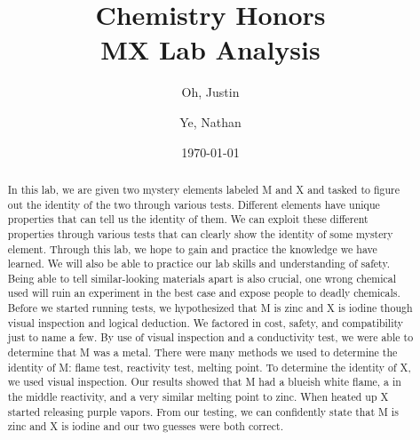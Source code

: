 \documentclass[titlepage]{article}
\title{\Huge{Chemistry Honors \\ MX Lab Analysis}}
\author{\huge{Oh, Justin} \and \huge{Ye, Nathan}}
\date{\LARGE{\today}}
\begin{document}
\maketitle


\begin{abstract}

In this lab, we are given two mystery elements labeled M and X and tasked to figure out the identity of the two through various tests. Different elements have unique properties that can tell us the identity of them. We can exploit these different properties through various tests that can clearly show the identity of some mystery element. Through this lab, we hope to gain and practice the knowledge we have learned. We will also be able to practice our lab skills and understanding of safety. Being able to tell similar-looking materials apart is also crucial, one wrong chemical used will ruin an experiment in the best case and expose people to deadly chemicals. Before we started running tests, we hypothesized that M is zinc and X is iodine though visual inspection and logical deduction. We factored in cost, safety, and compatibility just to name a few. By use of visual inspection and a conductivity test, we were able to determine that M was a metal. There were many methods we used to determine the identity of M: flame test, reactivity test, melting point. To determine the identity of X, we used visual inspection. Our results showed that M had a blueish white flame, a in the middle reactivity, and a very similar melting point to zinc. When heated up X started releasing purple vapors. From our testing, we can confidently state that M is zinc and X is iodine and our two guesses were both correct. 



\end{abstract}

\tableofcontents
\newpage
\end{document}
